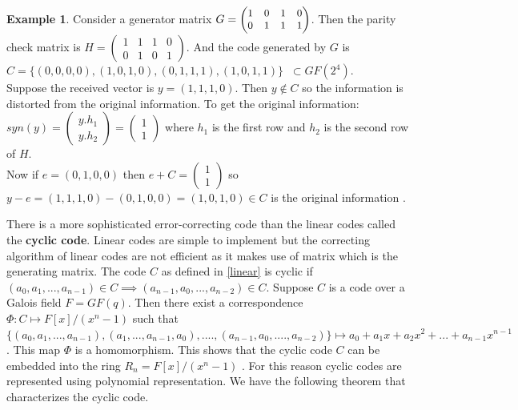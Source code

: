 \documentclass[a4paper,twoside,10pt]{article}
\theoremstyle{plain}
\theoremstyle{definition}
\newtheorem{example}[theorem]{Example}
\begin{document}
\begin{example}
  Consider a generator matrix \( \small G=\begin{pmatrix}
    1 & 0 & 1 & 0\\
    0 & 1 & 1 & 1
  \end{pmatrix}\). Then the parity check matrix is \(H=\begin{pmatrix}
    1 & 1 & 1 & 0\\
    0 & 1 & 0 & 1
  \end{pmatrix}\). And the code generated by \(G\) is \\ \(C=\{(0,0,0,0),(1,0,1,0),(0,1,1,1),(1,0,1,1)\} \;\; \subset GF(2^{4})\).\\

  Suppose the received vector is \(y=(1,1,1,0)\). Then \(y \not \in C\) so the information is distorted from the original information. To get the original information:\\
  \(syn(y)= \begin{pmatrix}
    y.h_1 \\ y.h_2
  \end{pmatrix} = \begin{pmatrix}
    1 \\ 1
  \end{pmatrix}\) where \(h_1\) is the first row and \(h_2\) is the second row of \(H\).\\
  Now if \(e=(0,1,0,0)\) then \(e+C=\begin{pmatrix}
    1 \\ 1
  \end{pmatrix}\) so \(y-e=(1,1,1,0)-(0,1,0,0)=(1,0,1,0) \in C\) is the original information \cite{error_correct}.
\end{example}

\noindent
There is a more sophisticated error-correcting code than the linear codes called the \textbf{cyclic code}. Linear codes are simple to implement but the correcting algorithm of linear codes are not efficient as it makes use of matrix which is the generating matrix. The code \(C\) as defined in \ref{linear} is cyclic if \((a_0,a_1,...,a_{n-1}) \in C \implies (a_{n-1},a_0,...,a_{n-2}) \in C\). Suppose \(C\) is a code over a Galois field \(F=GF(q)\). Then there exist a correspondence \(\Phi : C \mapsto F[x]/(x^n-1)\) such that \(\{(a_0,a_1,...,a_{n-1}),(a_1,...,a_{n-1},a_0),....,(a_{n-1},a_0,....,a_{n-2})\} \longmapsto a_0+a_1x+a_2x^2+...+a_{n-1}x^{n-1}\). This map \(\Phi\) is a homomorphism. This shows that the cyclic code \(C\) can be embedded into the ring \(R_n=F[x]/(x^n-1)\) \cite{error_correct}. For this reason cyclic codes are represented using polynomial representation. We have the following theorem that characterizes the cyclic code.
\end{document}
